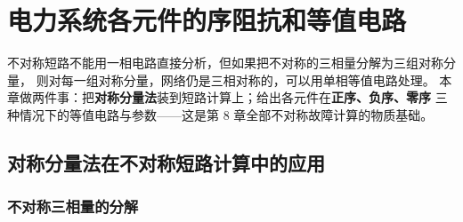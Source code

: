
\chapter{电力系统各元件的序阻抗和等值电路}

不对称短路不能用一相电路直接分析，但如果把不对称的三相量分解为三组对称分量，
则对每一组对称分量，网络仍是三相对称的，可以用单相等值电路处理。
本章做两件事：把\textbf{对称分量法}装到短路计算上；给出各元件在\textbf{正序、负序、零序}
三种情况下的等值电路与参数——这是第 8 章全部不对称故障计算的物质基础。

\section{对称分量法在不对称短路计算中的应用}

\subsection{不对称三相量的分解}

